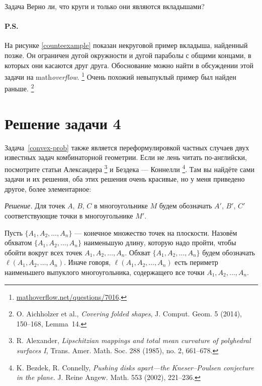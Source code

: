 \documentclass{article}
\begin{document}
\begin{thm}{Задача}
Верно ли, что круги и только они являются вкладышами?%
\end{thm}

{\sloppy

\paragraph{P.S.} На рисунке \ref{counteexample} показан некруговой пример вкладыша, найденный позже.
Он ограничен дугой окружности и дугой параболы с общими концами, в которых они касаются друг друга.
Обоснование можно найти в обсуждении этой задачи на math\textit{overflow}.%
\footnote{\href{http://mathoverflow.net/questions/7016}{mathoverflow.net/questions/7016}.}
Очень похожий невыпуклый пример был найден раньше.%
\footnote{O. Aichholzer et al., \textit{Covering folded shapes},
J. Comput. Geom. 5 (2014), 150--168, Lemma~14.}

}
\par\WFclear


\section{Решение задачи 4}\label{resh}





Задача~\ref{convex-prob} также является переформулировкой частных случаев двух известных задач комбинаторной геометрии. 
Если не лень читать по-английски, посмотрите статьи Александера%
\footnote{R. Alexander, \textit{Lipschitzian mappings and total mean curvature of polyhedral surfaces I}, Trans. Amer. Math. Soc. 288 (1985), no. 2, 661--678.}
и Бездека --- Коннелли%
\footnote{K. Bezdek, R. Connelly, \textit{Pushing disks apart---the Kneser--Poulsen conjecture in the plane.}  J. Reine Angew. Math.  553  (2002), 221--236.}.
Там вы найдёте сами задачи и их решения,
оба этих решения очень красивые, но у меня приведено другое, более элементарное:

\medskip

\noi\textit{Решение.} Для точек $A$, $B$, $C$ в многоугольнике $M$ будем обозначать $A'$, $B'$, $C'$ соответствующие точки в многоугольнике $M'$.

Пусть $\{A_1,A_2,\dots,A_n\}$ --- конечное множество точек на плоскости.
Назовём обхватом $\{A_1,A_2,\dots,A_n\}$ наименьшую длину, которую надо пройти, чтобы обойти вокруг всех точек $A_1,A_2,\dots,A_n$.
Обхват $\{A_1,A_2,\dots,A_n\}$ будем обозначать $\ell(A_1,A_2,\dots,A_n)$.
Иначе говоря, $\ell(A_1,A_2,\dots,A_n)$ есть периметр наименьшего выпуклого многоугольника, содержащего все точки $A_1,A_2,\dots,A_n$.
\end{document}
